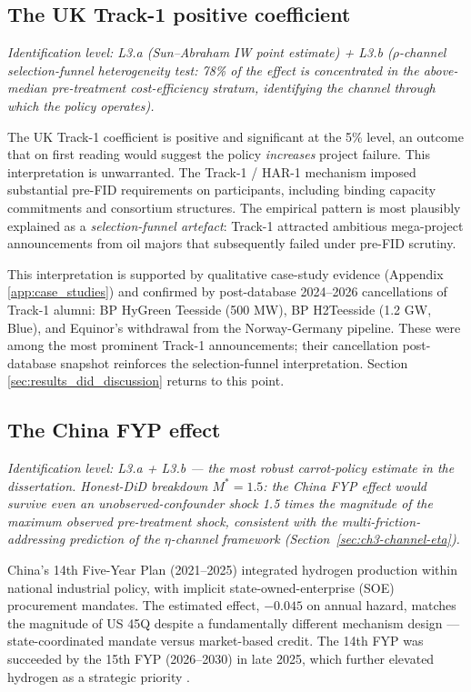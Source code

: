 \subsection{The UK Track-1 positive coefficient}
\noindent\emph{Identification level: L3.a (Sun--Abraham IW point estimate) + L3.b ($\rho$-channel selection-funnel heterogeneity test: 78\% of the effect is concentrated in the above-median pre-treatment cost-efficiency stratum, identifying the channel through which the policy operates).}


The UK Track-1 coefficient is positive and significant at the 5\% level, an outcome that on first reading would suggest the policy \emph{increases} project failure. This interpretation is unwarranted. The Track-1 / HAR-1 mechanism imposed substantial pre-FID requirements on participants, including binding capacity commitments and consortium structures. The empirical pattern is most plausibly explained as a \emph{selection-funnel artefact}: Track-1 attracted ambitious mega-project announcements from oil majors that subsequently failed under pre-FID scrutiny.

This interpretation is supported by qualitative case-study evidence (Appendix \ref{app:case_studies}) and confirmed by post-database 2024--2026 cancellations of Track-1 alumni: BP HyGreen Teesside (500 MW), BP H2Teesside (1.2 GW, Blue), and Equinor's withdrawal from the Norway-Germany pipeline. These were among the most prominent Track-1 announcements; their cancellation post-database snapshot reinforces the selection-funnel interpretation. Section \ref{sec:results_did_discussion} returns to this point.

\subsection{The China FYP effect}
\noindent\emph{Identification level: L3.a + L3.b — the most robust carrot-policy estimate in the dissertation. Honest-DiD breakdown $M^{*} = 1.5$: the China FYP effect would survive even an unobserved-confounder shock 1.5 times the magnitude of the maximum observed pre-treatment shock, consistent with the multi-friction-addressing prediction of the $\eta$-channel framework (Section~\ref{sec:ch3-channel-eta}).}


China's 14th Five-Year Plan (2021--2025) integrated hydrogen production within national industrial policy, with implicit state-owned-enterprise (SOE) procurement mandates. The estimated effect, $-0.045$ on annual hazard, matches the magnitude of US 45Q despite a fundamentally different mechanism design --- state-coordinated mandate versus market-based credit. The 14th FYP was succeeded by the 15th FYP (2026--2030) in late 2025, which further elevated hydrogen as a strategic priority \cite{ing2026}.

